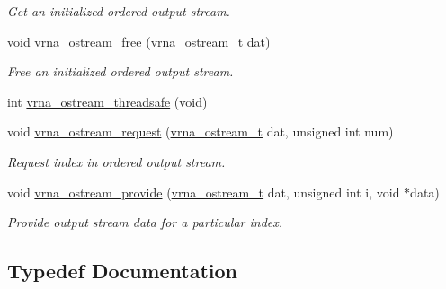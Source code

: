 \begin{DoxyCompactItemize}
\begin{DoxyCompactList}\small\item\em Get an initialized ordered output stream. \end{DoxyCompactList}\item 
void \mbox{\hyperlink{group__buffer__utils_gaf813ec90e1446ba82c89f9a39688a3b3}{vrna\+\_\+ostream\+\_\+free}} (\mbox{\hyperlink{group__buffer__utils_ga8da189552af21ab6e4e88bdcc240870c}{vrna\+\_\+ostream\+\_\+t}} dat)
\begin{DoxyCompactList}\small\item\em Free an initialized ordered output stream. \end{DoxyCompactList}\item 
int \mbox{\hyperlink{group__buffer__utils_ga4e60fb5548f6b56003860aa046a74ee2}{vrna\+\_\+ostream\+\_\+threadsafe}} (void)
\item 
void \mbox{\hyperlink{group__buffer__utils_gaebca91932705d71bcbf00bd8d82bd7c8}{vrna\+\_\+ostream\+\_\+request}} (\mbox{\hyperlink{group__buffer__utils_ga8da189552af21ab6e4e88bdcc240870c}{vrna\+\_\+ostream\+\_\+t}} dat, unsigned int num)
\begin{DoxyCompactList}\small\item\em Request index in ordered output stream. \end{DoxyCompactList}\item 
void \mbox{\hyperlink{group__buffer__utils_ga6253c42abdeaf3b41a38204865e1f0f7}{vrna\+\_\+ostream\+\_\+provide}} (\mbox{\hyperlink{group__buffer__utils_ga8da189552af21ab6e4e88bdcc240870c}{vrna\+\_\+ostream\+\_\+t}} dat, unsigned int i, void $\ast$data)
\begin{DoxyCompactList}\small\item\em Provide output stream data for a particular index. \end{DoxyCompactList}\end{DoxyCompactItemize}


\subsection{Typedef Documentation}
\mbox{\label{group__buffer__utils_ga445bbbcfca238a956bbc11862892adc8}} 
